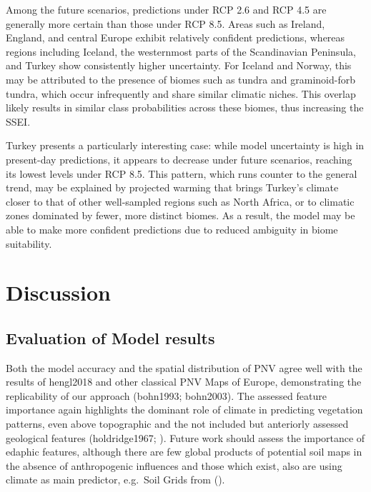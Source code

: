 \documentclass[
]{krantz}
\begin{document}
Among the future scenarios, predictions under RCP 2.6 and RCP 4.5 are generally more certain than those under RCP 8.5. Areas such as Ireland, England, and central Europe exhibit relatively confident predictions, whereas regions including Iceland, the westernmost parts of the Scandinavian Peninsula, and Turkey show consistently higher uncertainty. For Iceland and Norway, this may be attributed to the presence of biomes such as tundra and graminoid-forb tundra, which occur infrequently and share similar climatic niches. This overlap likely results in similar class probabilities across these biomes, thus increasing the SSEI.

Turkey presents a particularly interesting case: while model uncertainty is high in present-day predictions, it appears to decrease under future scenarios, reaching its lowest levels under RCP 8.5. This pattern, which runs counter to the general trend, may be explained by projected warming that brings Turkey's climate closer to that of other well-sampled regions such as North Africa, or to climatic zones dominated by fewer, more distinct biomes. As a result, the model may be able to make more confident predictions due to reduced ambiguity in biome suitability.

\section{Discussion}\label{discussion}

\subsection{Evaluation of Model results}\label{evaluation-of-model-results}

Both the model accuracy and the spatial distribution of PNV agree well with the results of hengl2018 and other classical PNV Maps of Europe, demonstrating the replicability of our approach (bohn1993; bohn2003). The assessed feature importance again highlights the dominant role of climate in predicting vegetation patterns, even above topographic and the not included but anteriorly assessed geological features (holdridge1967; \citet{mather1968}). Future work should assess the importance of edaphic features, although there are few global products of potential soil maps in the absence of anthropogenic influences and those which exist, also are using climate as main predictor, e.g.~Soil Grids from (\citet{hengl2017}).
\end{document}
